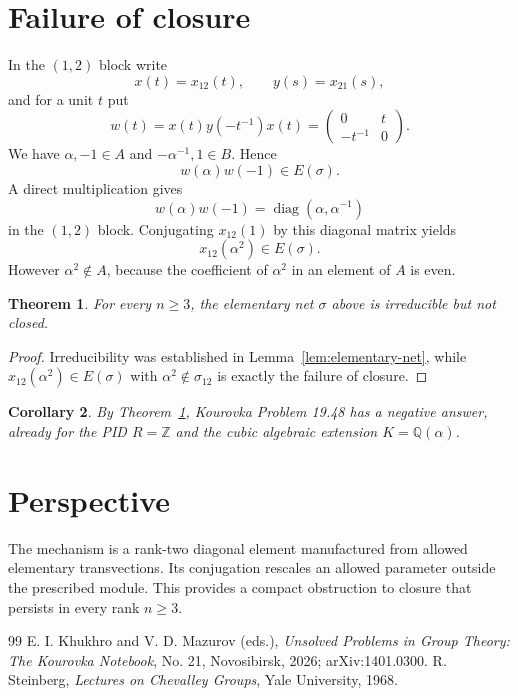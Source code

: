 \documentclass[11pt]{amsart}
\newtheorem{theorem}{Theorem}[section]
\newtheorem{corollary}[theorem]{Corollary}
\theoremstyle{definition}
\newcommand{\Z}{\mathbb Z}
\newcommand{\Q}{\mathbb Q}
\begin{document}
\section{Failure of closure}
In the $(1,2)$ block write
\[
 x(t)=x_{12}(t),\qquad y(s)=x_{21}(s),
\]
and for a unit $t$ put
\[
 w(t)=x(t)y(-t^{-1})x(t)
 =\begin{pmatrix}0&t\\-t^{-1}&0\end{pmatrix}.
\]
We have $\alpha,-1\in A$ and $-\alpha^{-1},1\in B$.  Hence
\[
 w(\alpha)w(-1)\in E(\sigma).
\]
A direct multiplication gives
\[
 w(\alpha)w(-1)=\operatorname{diag}(\alpha,\alpha^{-1})
\]
in the $(1,2)$ block.  Conjugating $x_{12}(1)$ by this diagonal matrix yields
\[
 x_{12}(\alpha^2)\in E(\sigma).
\]
However $\alpha^2\notin A$, because the coefficient of $\alpha^2$ in an element of $A$ is even.

\begin{theorem}\label{thm:irreducible-not-closed}
For every $n\geq3$, the elementary net $\sigma$ above is irreducible but not closed.
\end{theorem}
\begin{proof}
Irreducibility was established in Lemma~\ref{lem:elementary-net}, while $x_{12}(\alpha^2)\in E(\sigma)$ with $\alpha^2\notin\sigma_{12}$ is exactly the failure of closure.
\end{proof}

\begin{corollary}\label{cor:kourovka-19-48}
By Theorem~\ref{thm:irreducible-not-closed}, Kourovka Problem 19.48 has a negative answer, already for the PID $R=\Z$ and the cubic algebraic extension $K=\Q(\alpha)$.
\end{corollary}

\section{Perspective}
The mechanism is a rank-two diagonal element manufactured from allowed elementary transvections.  Its conjugation rescales an allowed parameter outside the prescribed module.  This provides a compact obstruction to closure that persists in every rank $n\geq3$.

\begin{thebibliography}{99}
 E. I. Khukhro and V. D. Mazurov (eds.), \emph{Unsolved Problems in Group Theory: The Kourovka Notebook}, No. 21, Novosibirsk, 2026; arXiv:1401.0300.
 R. Steinberg, \emph{Lectures on Chevalley Groups}, Yale University, 1968.
\end{thebibliography}
\end{document}
